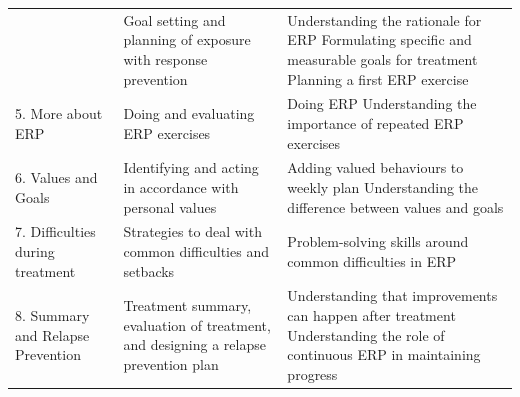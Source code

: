 \documentclass[]{book}
\theoremstyle{definition}
\theoremstyle{definition}
\theoremstyle{definition}
\theoremstyle{remark}
\begin{document}
\begin{longtable}[]{@{}lll@{}}
\begin{minipage}[t]{0.33\columnwidth}
\end{minipage} & \begin{minipage}[t]{0.33\columnwidth}\raggedright
Goal setting and planning of exposure with response prevention\strut
\end{minipage} & \begin{minipage}[t]{0.25\columnwidth}\raggedright
Understanding the rationale for ERP Formulating specific and measurable
goals for treatment Planning a first ERP exercise\strut
\end{minipage}\tabularnewline
\begin{minipage}[t]{0.33\columnwidth}\raggedright
5. More about ERP\strut
\end{minipage} & \begin{minipage}[t]{0.33\columnwidth}\raggedright
Doing and evaluating ERP exercises\strut
\end{minipage} & \begin{minipage}[t]{0.25\columnwidth}\raggedright
Doing ERP Understanding the importance of repeated ERP exercises\strut
\end{minipage}\tabularnewline
\begin{minipage}[t]{0.33\columnwidth}\raggedright
6. Values and Goals\strut
\end{minipage} & \begin{minipage}[t]{0.33\columnwidth}\raggedright
Identifying and acting in accordance with personal values\strut
\end{minipage} & \begin{minipage}[t]{0.25\columnwidth}\raggedright
Adding valued behaviours to weekly plan Understanding the difference
between values and goals\strut
\end{minipage}\tabularnewline
\begin{minipage}[t]{0.33\columnwidth}\raggedright
7. Difficulties during treatment\strut
\end{minipage} & \begin{minipage}[t]{0.33\columnwidth}\raggedright
Strategies to deal with common difficulties and setbacks\strut
\end{minipage} & \begin{minipage}[t]{0.25\columnwidth}\raggedright
Problem-solving skills around common difficulties in ERP\strut
\end{minipage}\tabularnewline
\begin{minipage}[t]{0.33\columnwidth}\raggedright
8. Summary and Relapse Prevention\strut
\end{minipage} & \begin{minipage}[t]{0.33\columnwidth}\raggedright
Treatment summary, evaluation of treatment, and designing a relapse
prevention plan\strut
\end{minipage} & \begin{minipage}[t]{0.25\columnwidth}\raggedright
Understanding that improvements can happen after treatment Understanding
the role of continuous ERP in maintaining progress\strut
\end{minipage}\tabularnewline
\bottomrule
\end{longtable}
\end{document}
